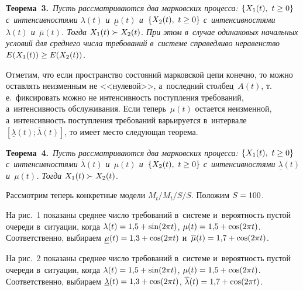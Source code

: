 \begin{multicols}{2}
\smallskip

\noindent
\textbf{Теорема~3.}\ \textit{Пусть рассматриваются два марковских процесса:  $\{X_1(t), \ 
t\hm\geq 0 \}$ с~интенсивностями $\lambda(t)$ и~$\underline\mu(t)$ и~$\{X_2(t), \ 
t\hm\geq 0 \}$ с~интенсивностями~$\lambda(t)$ и~$\overline\mu(t)$. Тогда $X_1(t) 
\hm\succ X_2(t)$. При этом в~случае одинаковых начальных условий для среднего числа 
требований в~системе справедливо неравенство $E(X_1(t)) \hm\ge  E(X_2(t))$.
}

\medskip


Отметим, что если пространство состояний марковской цепи конечно, то можно 
оставлять неизменным не <<нулевой>>, а~последний столбец~$A(t)$, т.\,е.\ 
фиксировать можно не интенсивность поступления требований, а~интенсивность 
обслуживания. Если теперь~$\mu(t)$ остается неизменной, а~интенсивность 
поступления требований варьируется в~интервале $\left[\underline\lambda(t); 
\overline\lambda(t)\right]$, то имеет место следующая тео\-рема.

\medskip

\noindent
\textbf{Теорема~4.}\ \textit{Пусть рассматриваются два марковских процесса: $\{X_1(t), \ 
t\hm\geq 0 \}$ с~интенсивностями $\overline\lambda(t)$ и~$\mu(t)$ и~$\{X_2(t), \ 
t\hm\geq 0 \}$ с~интенсивностями $\underline\lambda(t)$ и~$\mu(t)$. Тогда $X_1(t) 
\hm\succ X_2(t)$}.

\smallskip

Рассмотрим теперь конкретные модели $M_t/M_t/S/S$. Положим $S\hm=100$.

На рис.~1 показаны среднее число требований в~системе и~вероятность пустой 
очереди в~ситуации, когда $\lambda(t)\hm= 1{,}5 \hm+ \sin(2\pi t)$, $\mu(t)\hm= 1{,}5\hm + 
\cos(2\pi t)$. Соответственно, выбираем $\underline\mu(t)\hm= 1{,}3\hm + \cos(2\pi t)$ 
и~$\overline\mu(t)\hm= 1{,}7 \hm + \cos(2\pi t)$.






На рис.~2 показаны среднее число требований в~системе и~вероятность пустой 
очереди в~ситуации, когда $\lambda(t)\hm= 1{,}5\hm + \sin(2\pi t)$, $\mu(t)\hm= 1{,}5 \hm+ 
\cos(2\pi t)$. Соответственно, выбираем $\underline\lambda(t)\hm= 1{,}3 \hm+ \cos(2\pi 
t)$,  $\overline\lambda(t)\hm= 1{,}7 \hm + \cos(2\pi t)$.









{\small\frenchspacing
 {\baselineskip=10.5pt
 \begin{thebibliography}{9}




\end{thebibliography}}}
\end{multicols}
